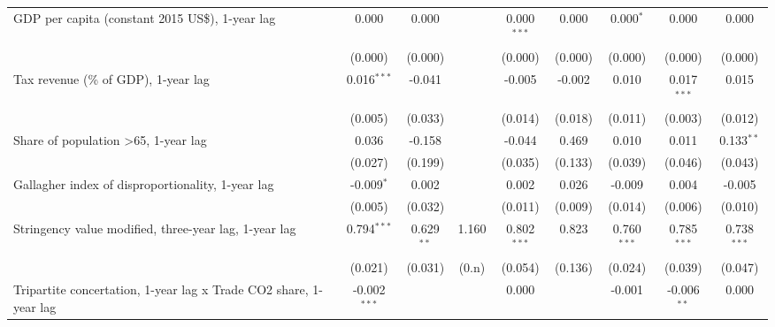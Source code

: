 \begin{table}[htbp]
\begin{tabular}{lcccccccc}
      GDP per capita (constant 2015 US\$), 1-year lag                   & 0.000          & 0.000                     &              & 0.000$^{***}$  & 0.000            & 0.000$^{*}$     & 0.000           & 0.000\\   
                                                                        & (0.000)        & (0.000)                   &              & (0.000)        & (0.000)          & (0.000)         & (0.000)         & (0.000)\\   
      Tax revenue (\% of GDP), 1-year lag                               & 0.016$^{***}$  & -0.041                    &              & -0.005         & -0.002           & 0.010           & 0.017$^{***}$   & 0.015\\   
                                                                        & (0.005)        & (0.033)                   &              & (0.014)        & (0.018)          & (0.011)         & (0.003)         & (0.012)\\   
      Share of population >65, 1-year lag                               & 0.036          & -0.158                    &              & -0.044         & 0.469            & 0.010           & 0.011           & 0.133$^{**}$\\   
                                                                        & (0.027)        & (0.199)                   &              & (0.035)        & (0.133)          & (0.039)         & (0.046)         & (0.043)\\   
      Gallagher index of disproportionality, 1-year lag                 & -0.009$^{*}$   & 0.002                     &              & 0.002          & 0.026            & -0.009          & 0.004           & -0.005\\   
                                                                        & (0.005)        & (0.032)                   &              & (0.011)        & (0.009)          & (0.014)         & (0.006)         & (0.010)\\   
      Stringency value modified, three-year lag, 1-year lag             & 0.794$^{***}$  & 0.629$^{**}$              & 1.160        & 0.802$^{***}$  & 0.823            & 0.760$^{***}$   & 0.785$^{***}$   & 0.738$^{***}$\\   
                                                                        & (0.021)        & (0.031)                   & (0.n)        & (0.054)        & (0.136)          & (0.024)         & (0.039)         & (0.047)\\   
      Tripartite concertation, 1-year lag x Trade CO2 share, 1-year lag & -0.002$^{***}$ &                           &              & 0.000          &                  & -0.001          & -0.006$^{**}$   & 0.000\\   

\end{tabular}
\end{table}
